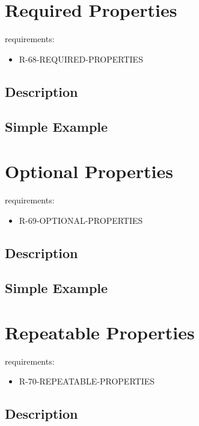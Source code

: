 \documentclass{llncs}
\begin{document}
\section{Required Properties}

requirements:

\begin{itemize}
	\item R-68-REQUIRED-PROPERTIES
\end{itemize}

\subsection{Description}

\subsection{Simple Example}

\section{Optional Properties}

requirements:

\begin{itemize}
	\item R-69-OPTIONAL-PROPERTIES
\end{itemize}

\subsection{Description}

\subsection{Simple Example}

\section{Repeatable Properties}

requirements:

\begin{itemize}
	\item R-70-REPEATABLE-PROPERTIES
\end{itemize}

\subsection{Description}
\end{document}
